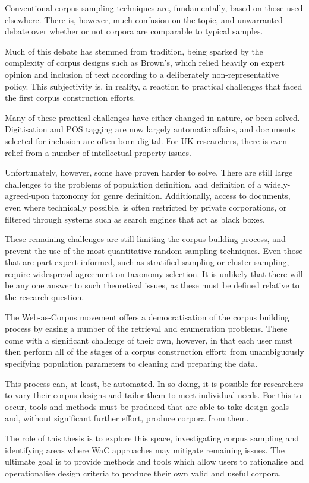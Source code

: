 
Conventional corpus sampling techniques are, fundamentally, based on those used elsewhere.  There is, however, much confusion on the topic, and unwarranted debate over whether or not corpora are comparable to typical samples.

Much of this debate has stemmed from tradition, being sparked by the complexity of corpus designs such as Brown's, which relied heavily on expert opinion and inclusion of text according to a deliberately non-representative policy.  This subjectivity is, in reality, a reaction to practical challenges that faced the first corpus construction efforts.

Many of these practical challenges have either changed in nature, or been solved.  Digitisation and POS tagging are now largely automatic affairs, and documents selected for inclusion are often born digital.  For UK researchers, there is even relief from a number of intellectual property issues.

Unfortunately, however, some have proven harder to solve.  There are still large challenges to the problems of population definition, and definition of a widely-agreed-upon taxonomy for genre definition.  Additionally, access to documents, even where technically possible, is often restricted by private corporations, or filtered through systems such as search engines that act as black boxes.

These remaining challenges are still limiting the corpus building process, and prevent the use of the most quantitative random sampling techniques.  Even those that are part expert-informed, such as stratified sampling or cluster sampling, require widespread agreement on taxonomy selection.  It is unlikely that there will be any one answer to such theoretical issues, as these must be defined relative to the research question.

The Web-as-Corpus movement offers a democratisation of the corpus building process by easing a number of the retrieval and enumeration problems.  These come with a significant challenge of their own, however, in that each user must then perform all of the stages of a corpus construction effort: from unambiguously specifying population parameters to cleaning and preparing the data.

This process can, at least, be automated.  In so doing, it is possible for researchers to vary their corpus designs and tailor them to meet individual needs.  For this to occur, tools and methods must be produced that are able to take design goals and, without significant further effort, produce corpora from them.

The role of this thesis is to explore this space, investigating corpus sampling and identifying areas where WaC approaches may mitigate remaining issues.  The ultimate goal is to provide methods and tools which allow users to rationalise and operationalise design criteria to produce their own valid and useful corpora.


